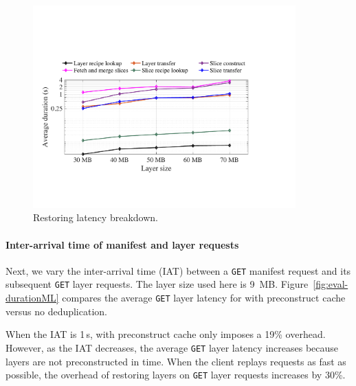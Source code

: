 \begin{figure}[t]
	\begin{minipage}{0.3\textwidth}
	\centering
	\includegraphics[width=0.9\textwidth]{graphs/restoringbreakdown.pdf}
	\caption{Restoring latency breakdown. }
	\label{fig:eval-restoringbreakdown}
	\end{minipage}
\end{figure}
 
\paragraph{Inter-arrival time of manifest and layer requests}
%
Next, we vary the inter-arrival time (IAT) between a \texttt{GET} manifest request and its
subsequent \texttt{GET} layer requests.
%
The layer size used here is 9~MB.
%
Figure~\ref{fig:eval-durationML} compares the average \texttt{GET} layer latency for
\sysname with preconstruct cache versus no deduplication.

When the IAT is 1\,s, \sysname with preconstruct cache only imposes a 19\% overhead.
%
However, as the IAT decreases, the average \texttt{GET} layer latency increases because
layers are not preconstructed in time.
%
When the client replays requests as fast as possible, the overhead of restoring layers on
\texttt{GET} layer requests increases by 30\%.
%

